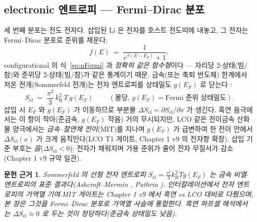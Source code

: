 \documentclass[11pt,a4paper]{article}
\newtheorem*{srcbox}{문헌 근거}
\newcommand{\elc}{\mathrm{el}}
\newcommand{\kB}{k_{\mathrm B}}
\begin{document}
\subsection{electronic 엔트로피 — Fermi--Dirac 분포}\label{sec:sel}
세 번째 분포는 전도 전자다. 삽입된 Li 은 전자를 호스트 전도띠에 내놓고, 그 전자는 Fermi--Dirac 분포로
준위를 채운다:
\begin{equation}
f(E) \;=\; \frac{1}{e^{\beta(E-E_F)}+1}.
\label{eq:FD}
\end{equation}
configurational 의 식~\eqref{eq:nFermi} 과 \emph{정확히 같은 함수형}이다 — 자리당 2-상태(빔/참)와 준위당
2-상태(빔/참)가 같은 통계이기 때문. 금속(또는 축퇴 반도체) 한계에서 저온 전개(Sommerfeld 전개)는 전자
엔트로피를 상태밀도 $g(E_F)$ 로 닫는다 \cite{pathria,ashcroft}:
\begin{equation}
\boxed{\;
S_\elc \;=\; \frac{\pi^2}{3}\,\kB^2\,T\,g(E_F)
\;}
\qquad(\text{몰당, } g(E_F)=\text{Fermi 준위 상태밀도}).
\label{eq:sommerfeld}
\end{equation}
삽입 시 $E_F$ 와 $g(E_F)$ 가 이동하므로 부분몰 $\Delta S_\elc=\partial S_\elc/\partial x$ 가 생긴다. 흑연
음극에서는 이 항이 작아(준금속, $g(E_F)$ 작음) 거의 무시되지만, LCO 같은 전이금속 산화물 양극에서는
\emph{금속--절연체 전이}(MIT)를 지나며 $g(E_F)$ 가 급변하여 한 전이 안에서 $\Delta S_\elc(x)$ 가 크게
움직인다(LCO T1 게이트, Chapter 1 v9 의 전자항 확장). 삽입 기준 부호는 \emph{음}($\Delta S_\elc<0$):
전자가 채워지며 가용 준위가 줄어 전자 무질서가 감소(Chapter 1 v9 규약 일관).

\begin{srcbox}
Sommerfeld 의 선형 전자 엔트로피 $S_\elc=\tfrac{\pi^2}{3}\kB^2 T g(E_F)$ 는 금속 비열$\cdot$엔트로피의
표준 결과다(Ashcroft--Mermin \cite{ashcroft}, Pathria \cite{pathria}). 인터칼레이션에서 전자 엔트로피의
가역열 기여$\cdot$MIT 게이트는 Chapter 1 v9 에서 흑연 vs LCO 대비로 다뤘으며, 본 장은 그것을 \emph{Fermi--Dirac
분포}로 가역열 사슬에 통합한다. 흑연 하프셀 해석에서는 $\Delta S_\elc\approx0$ 로 두는 것이 정당하다(준금속
상태밀도 낮음).
\end{srcbox}
\end{document}
